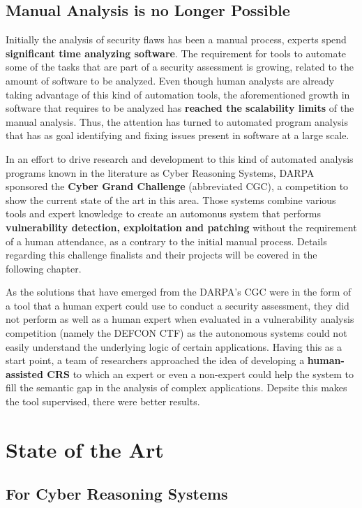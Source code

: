 \documentclass[12pt,a4paper,english,onecolumn]{IEEEtran}
\begin{document}
\subsection{Manual Analysis is no Longer Possible}

Initially the analysis of security flaws has been a manual process, experts spend \textbf{significant time analyzing software}. The requirement for tools to automate some of the tasks that are part of a security assessment is growing, related to the amount of software to be analyzed. Even though human analysts are already taking advantage of this kind of automation tools, the aforementioned growth in software that requires to be analyzed has \textbf{reached the scalability limits} of the manual analysis. Thus, the attention has turned to automated program analysis that has as goal identifying and fixing issues present in software at a large scale.

In an effort to drive research and development to this kind of automated analysis programs known in the literature as Cyber Reasoning Systems, DARPA sponsored the \textbf{Cyber Grand Challenge} (abbreviated CGC), a competition to show the current state of the art in this area. Those systems combine various tools and expert knowledge to create an automonus system that performs \textbf{vulnerability detection, exploitation and patching} without the requirement of a human attendance, as a contrary to the initial manual process. Details regarding this challenge finalists and their projects will be covered in the following chapter.

As the solutions that have emerged from the DARPA's CGC were in the form of a tool that a human expert could use to conduct a security assessment, they did not perform as well as a human expert when evaluated in a vulnerability analysis competition (namely the DEFCON CTF) as the autonomous systems could not easily understand the underlying logic of certain applications. Having this as a start point, a team of researchers \cite{hacrs} approached the idea of developing a \textbf{human-assisted CRS} to which an expert or even a non-expert could help the system to fill the semantic gap in the analysis of complex applications. Depsite this makes the tool supervised, there were better results.

\section{State of the Art}

\subsection{For Cyber Reasoning Systems}
\end{document}

